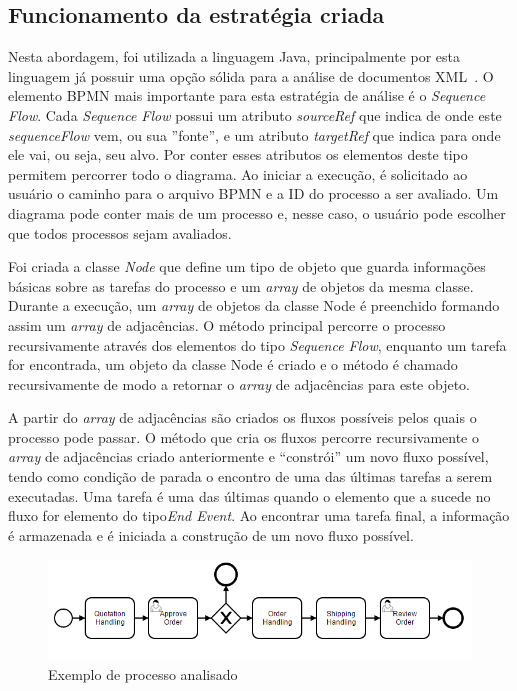 \documentclass[12pt]{article}
\begin{document}

\subsection{Funcionamento da estratégia criada}

Nesta abordagem, foi utilizada a linguagem Java, principalmente por esta linguagem já possuir uma opção sólida para a análise de documentos XML~\cite{javadom}. O elemento BPMN mais importante para esta estratégia de análise é o \emph{Sequence Flow}. Cada \emph{Sequence Flow} possui um atributo \emph{sourceRef} que indica de onde este \emph{sequenceFlow} vem, ou sua ''fonte'', e um atributo \emph{targetRef} que indica para onde ele vai, ou seja, seu alvo. Por conter esses atributos os elementos deste tipo permitem percorrer todo o diagrama. Ao iniciar a execução, é solicitado ao usuário o caminho para o arquivo BPMN e a ID do processo a ser avaliado. Um diagrama pode conter mais de um processo e, nesse caso, o usuário pode escolher que todos processos sejam avaliados.

Foi criada a classe \emph{Node} que define um tipo de objeto que guarda informações básicas sobre as tarefas do processo e um \emph{array} de objetos da mesma classe. Durante a execução, um \emph{array} de objetos da classe Node é preenchido formando assim um \emph{array} de adjacências. O método principal percorre o processo recursivamente através dos elementos do tipo \emph{Sequence Flow}, enquanto um tarefa for encontrada, um objeto da classe Node é criado e o método é chamado recursivamente de modo a retornar o \emph{array} de adjacências para este objeto.

A partir do \emph{array} de adjacências são criados os fluxos possíveis pelos quais o processo pode passar. O método que cria os fluxos percorre recursivamente o \emph{array} de adjacências criado anteriormente e ``constrói'' um novo fluxo possível, tendo como condição de parada o encontro de uma das últimas tarefas a serem executadas. Uma tarefa é uma das últimas quando o elemento que a sucede no fluxo for elemento do tipo\emph{End Event}. Ao encontrar uma tarefa final, a informação é armazenada e é iniciada a construção de um novo fluxo possível.

\begin{figure}[ht]
\centering
\includegraphics[width=.9\textwidth]{figuras/diagram5.png}
\caption{Exemplo de processo analisado}
\label{fig:diagram5}
\end{figure}
\end{document}
